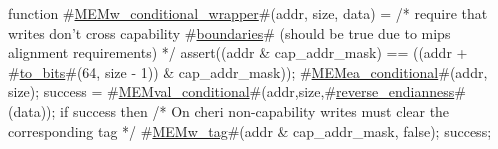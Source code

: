 function #\hyperref[zMEMwzyconditionalzywrapper]{MEMw\_conditional\_wrapper}#(addr, size, data) =
  {
    /* require that writes don't cross capability #\hyperref[zboundaries]{boundaries}# (should be true due to mips alignment requirements) */
    assert((addr & cap_addr_mask) == ((addr + #\hyperref[ztozybits]{to\_bits}#(64, size - 1)) & cap_addr_mask));
    #\hyperref[zMEMeazyconditional]{MEMea\_conditional}#(addr, size);
    success = #\hyperref[zMEMvalzyconditional]{MEMval\_conditional}#(addr,size,#\hyperref[zreversezyendianness]{reverse\_endianness}#(data));
    if success then
       /* On cheri non-capability writes must clear the corresponding tag */
       #\hyperref[zMEMwzytag]{MEMw\_tag}#(addr & cap_addr_mask, false);
    success;
  }
